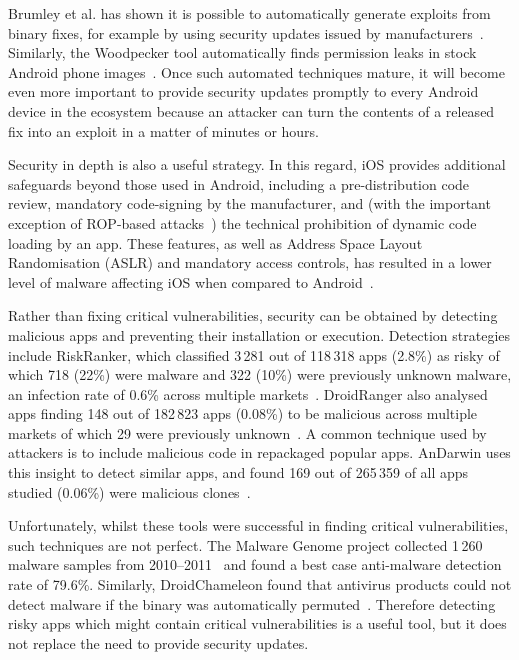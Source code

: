 \documentclass{llncs}
\begin{document}
Brumley et al. has shown it is possible to automatically generate exploits from binary fixes, for example by using security updates issued by manufacturers~\cite{Brumley2008}. 
Similarly, the Woodpecker tool automatically finds permission leaks in stock Android phone images~\cite{Grace2012}.
Once such automated techniques mature, it will become even more important to provide security updates promptly to every Android device in the ecosystem because an attacker can turn the contents of a released fix into an exploit in a matter of minutes or hours.

Security in depth is also a useful strategy.
In this regard, iOS provides additional safeguards beyond those used in Android, including a pre-distribution code review, mandatory code-signing by the manufacturer, and (with the important exception of ROP-based attacks~\cite{Wang2013a}) the technical prohibition of dynamic code loading by an app.
These features, as well as Address Space Layout Randomisation (ASLR) and mandatory access controls, has resulted in a lower level of malware affecting iOS when compared to Android~\cite{Felt2011}.

Rather than fixing critical vulnerabilities, security can be obtained by detecting malicious apps and preventing their installation or execution.
Detection strategies include RiskRanker, which classified 3\,281 out of 118\,318 apps (2.8\%) as risky of which 718 (22\%) were malware and 322 (10\%) were previously unknown malware, an infection rate of 0.6\% across multiple markets~\cite{Grace2012a}.
DroidRanger also analysed apps finding 148 out of 182\,823 apps (0.08\%) to be malicious across multiple markets of which 29 were previously unknown~\cite{Zhou2012a}.
A common technique used by attackers is to include malicious code in repackaged popular apps. 
AnDarwin uses this insight to detect similar apps, and found 169 out of 265\,359 of all apps studied (0.06\%) were malicious clones~\cite{Crussell2013}.

Unfortunately, whilst these tools were successful in finding critical vulnerabilities, such techniques are not perfect.
The Malware Genome project collected 1\,260 malware samples from 2010--2011~\cite{Zhou2012b} and found a best case anti-malware detection rate of 79.6\%.
Similarly, DroidChameleon found that antivirus products could not detect malware if the binary was automatically permuted~\cite{Rastogi2013}.
Therefore detecting risky apps which might contain critical vulnerabilities is a useful tool, but it does not replace the need to provide security updates.
\end{document}
